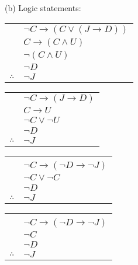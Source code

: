\documentclass{article}
\begin{document}
\break
(b) Logic statements:
\newline
\newline
\begin{tabular}{c@{\,}l@{}} 
                         & $\neg C \rightarrow (C \vee (J \rightarrow D))$ \\
                         & $C \rightarrow (C \wedge U)$ \\
                         & $\neg (C \wedge U)$ \\
                         & $\neg D$ \\
\arrayrulecolor{blue}
\cline{2-2}
    $\therefore$         & $\neg J$ \\
\end{tabular}
\begin{tabular}{c@{\,}l@{}} 
                         & $\neg C \rightarrow (J \rightarrow D)$ \\
                         & $C \rightarrow U$ \\
                         & $\neg C \vee \neg U$ \\
                         & $\neg D$ \\
\arrayrulecolor{blue}
\cline{2-2}
    $\therefore$         & $\neg J$ \\
\end{tabular}
\begin{tabular}{c@{\,}l@{}} 
                         & \\
                         & $\neg C \rightarrow (\neg D \rightarrow \neg J)$ \\
                         & $\neg C \vee \neg C$ \\
                         & $\neg D$ \\
\arrayrulecolor{blue}
\cline{2-2}
    $\therefore$         & $\neg J$ \\
\end{tabular}
\begin{tabular}{c@{\,}l@{}} 
                         & \\
                         & $\neg C \rightarrow (\neg D \rightarrow \neg J)$ \\
                         & $\neg C$ \\
                         & $\neg D$ \\
\arrayrulecolor{blue}
\cline{2-2}
    $\therefore$         & $\neg J$ \\
\end{tabular}
\end{document}
